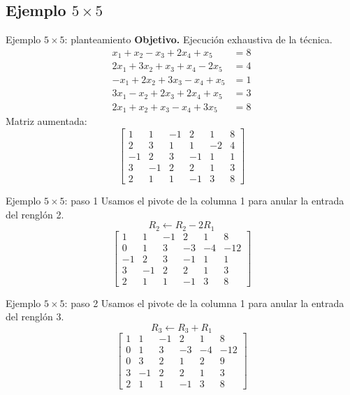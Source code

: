 \documentclass[aspectratio=169,9pt]{beamer}
\theoremstyle{remark}
\begin{document}
\subsection{Ejemplo $5\times5$}
\begin{frame}[t]{Ejemplo $5\times5$: planteamiento}
\textbf{Objetivo.} Ejecución exhaustiva de la técnica.
\[
\begin{aligned}
x_{1} + x_{2} - x_{3} + 2 x_{4} + x_{5} &= 8\\
2 x_{1} + 3 x_{2} + x_{3} + x_{4} - 2 x_{5} &= 4\\
- x_{1} + 2 x_{2} + 3 x_{3} - x_{4} + x_{5} &= 1\\
3 x_{1} - x_{2} + 2 x_{3} + 2 x_{4} + x_{5} &= 3\\
2 x_{1} + x_{2} + x_{3} - x_{4} + 3 x_{5} &= 8
\end{aligned}
\]
Matriz aumentada:
\[
\left[\begin{array}{ccccc|c}
1 & 1 & -1 & 2 & 1 & 8\\
2 & 3 & 1 & 1 & -2 & 4\\
-1 & 2 & 3 & -1 & 1 & 1\\
3 & -1 & 2 & 2 & 1 & 3\\
2 & 1 & 1 & -1 & 3 & 8
\end{array}\right]
\]
\end{frame}
\begin{frame}[t]{Ejemplo $5\times5$: paso 1}
Usamos el pivote de la columna 1 para anular la entrada del renglón 2.
\[
R_{2}\leftarrow R_{2}-2R_{1}
\]
\[
\left[\begin{array}{ccccc|c}
1 & 1 & -1 & 2 & 1 & 8\\
0 & 1 & 3 & -3 & -4 & -12\\
-1 & 2 & 3 & -1 & 1 & 1\\
3 & -1 & 2 & 2 & 1 & 3\\
2 & 1 & 1 & -1 & 3 & 8
\end{array}\right]
\]
\end{frame}
\begin{frame}[t]{Ejemplo $5\times5$: paso 2}
Usamos el pivote de la columna 1 para anular la entrada del renglón 3.
\[
R_{3}\leftarrow R_{3}+R_{1}
\]
\[
\left[\begin{array}{ccccc|c}
1 & 1 & -1 & 2 & 1 & 8\\
0 & 1 & 3 & -3 & -4 & -12\\
0 & 3 & 2 & 1 & 2 & 9\\
3 & -1 & 2 & 2 & 1 & 3\\
2 & 1 & 1 & -1 & 3 & 8
\end{array}\right]
\]
\end{frame}
\end{document}

